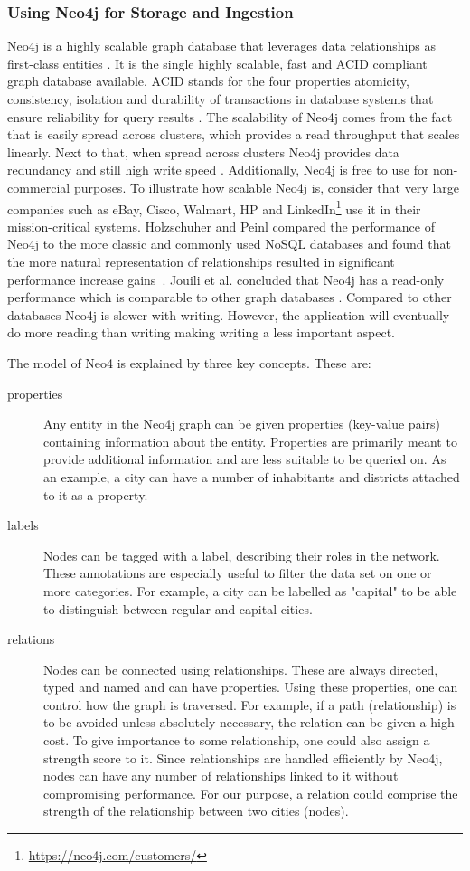 \subsubsection{Using Neo4j for Storage and Ingestion}
Neo4j is a highly scalable graph database that leverages data relationships as first-class entities \cite{neo4j}. It is the single highly scalable, fast and ACID compliant graph database available. ACID stands for the four properties atomicity, consistency, isolation and durability of transactions in database systems that ensure reliability for query results \cite{haerder1983principles}. The scalability of Neo4j comes from the fact that is easily spread across clusters, which provides a read throughput that scales linearly. Next to that, when spread across clusters Neo4j provides data redundancy and still high write speed \cite{neo4jscalable}. Additionally, Neo4j is free to use for non-commercial purposes. To illustrate how scalable Neo4j is, consider that very large companies such as eBay, Cisco, Walmart, HP and LinkedIn\footnote{\url{https://neo4j.com/customers/}} use it in their mission-critical systems. Holzschuher and Peinl compared the performance of Neo4j to the more classic and commonly used NoSQL databases and found that the more natural representation of relationships resulted in significant performance increase gains~\cite{holzschuher2013performance}. Jouili et al. concluded that Neo4j has a read-only performance which is comparable to other graph databases \cite{jouili2013}. Compared to other databases Neo4j is slower with writing. However, the application will eventually do more reading than writing making writing a less important aspect.

The model of Neo4 is explained by three key concepts. These are:

\begin{description}
\item[properties] Any entity in the Neo4j graph can be given properties (key-value pairs) containing information about the entity. Properties are primarily meant to provide additional information and are less suitable to be queried on. As an example, a city can have a number of inhabitants and districts attached to it as a property.
\item[labels] Nodes can be tagged with a label, describing their roles in the network. These annotations are especially useful to filter the data set on one or more categories. For example, a city can be labelled as "capital" to be able to distinguish between regular and capital cities.
\item[relations] Nodes can be connected using relationships. These are always directed, typed and named and can have properties. Using these properties, one can control how the graph is traversed. For example, if a path (relationship) is to be avoided unless absolutely necessary, the relation can be given a high cost. To give importance to some relationship, one could also assign a strength score to it. Since relationships are handled efficiently by Neo4j, nodes can have any number of relationships linked to it without compromising performance. For our purpose, a relation could comprise the strength of the relationship between two cities (nodes).
\end{description}

